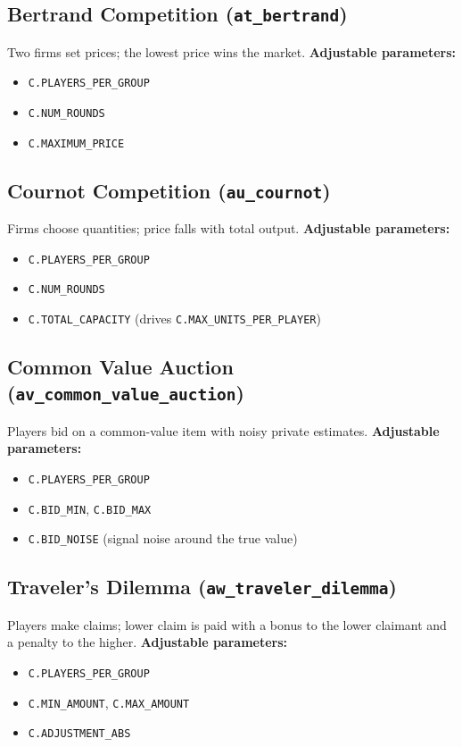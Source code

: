 \documentclass[11pt]{article}
\begin{document}
\subsection*{Bertrand Competition (\texttt{at\_bertrand})}
Two firms set prices; the lowest price wins the market.
\textbf{Adjustable parameters:}
\begin{itemize}
\item \texttt{C.PLAYERS\_PER\_GROUP}
\item \texttt{C.NUM\_ROUNDS}
\item \texttt{C.MAXIMUM\_PRICE}
\end{itemize}

\subsection*{Cournot Competition (\texttt{au\_cournot})}
Firms choose quantities; price falls with total output.
\textbf{Adjustable parameters:}
\begin{itemize}
\item \texttt{C.PLAYERS\_PER\_GROUP}
\item \texttt{C.NUM\_ROUNDS}
\item \texttt{C.TOTAL\_CAPACITY} (drives \texttt{C.MAX\_UNITS\_PER\_PLAYER})
\end{itemize}

\subsection*{Common Value Auction (\texttt{av\_common\_value\_auction})}
Players bid on a common-value item with noisy private estimates.
\textbf{Adjustable parameters:}
\begin{itemize}
\item \texttt{C.PLAYERS\_PER\_GROUP}
\item \texttt{C.BID\_MIN}, \texttt{C.BID\_MAX}
\item \texttt{C.BID\_NOISE} (signal noise around the true value)
\end{itemize}

\subsection*{Traveler's Dilemma (\texttt{aw\_traveler\_dilemma})}
Players make claims; lower claim is paid with a bonus to the lower claimant and a penalty to the higher.
\textbf{Adjustable parameters:}
\begin{itemize}
\item \texttt{C.PLAYERS\_PER\_GROUP}
\item \texttt{C.MIN\_AMOUNT}, \texttt{C.MAX\_AMOUNT}
\item \texttt{C.ADJUSTMENT\_ABS}
\end{itemize}
\end{document}
